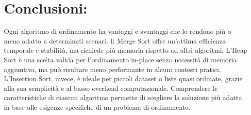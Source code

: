 \documentclass[a4paper]{article}
\begin{document}
\section{Conclusioni:}
Ogni algoritmo di ordinamento ha vantaggi e svantaggi che lo rendono più o meno adatto a determinati scenari. Il Merge Sort offre un’ottima efficienza 
temporale e stabilità, ma richiede più memoria rispetto ad altri algoritmi. L’Heap Sort è una scelta valida per l’ordinamento in-place senza necessità 
di memoria aggiuntiva, ma può risultare meno performante in alcuni contesti pratici. L’Insertion Sort, invece, è ideale per piccoli dataset o liste quasi 
ordinate, grazie alla sua semplicità e al basso overhead computazionale. Comprendere le caratteristiche di ciascun algoritmo permette di scegliere la soluzione 
più adatta in base alle esigenze specifiche di un problema di ordinamento.
\end{document}
